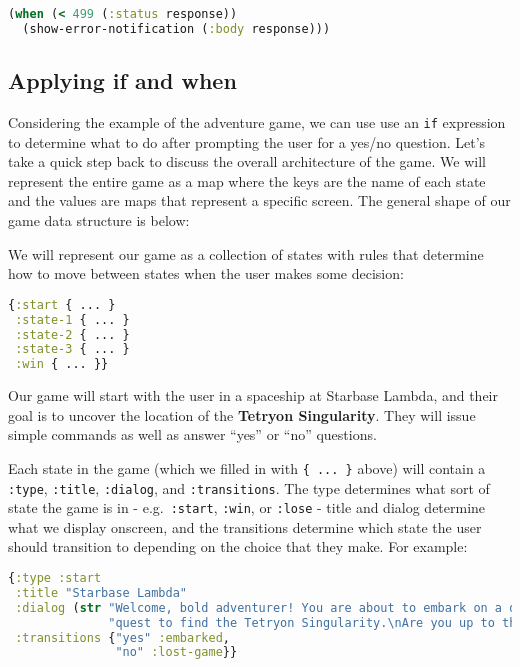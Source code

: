 \documentclass[10pt,twoside,openright]{memoir}
\begin{document}
\begin{lstlisting}[language=Clojure, caption={Conditionally perform side effect}]
(when (< 499 (:status response))
  (show-error-notification (:body response)))
\end{lstlisting}

\subsection{Applying if and when}

Considering the example of the adventure game, we can use use an
\texttt{if} expression to determine what to do after prompting the user
for a yes/no question. Let's take a quick step back to discuss the
overall architecture of the game. We will represent the entire game as a
map where the keys are the name of each state and the values are maps
that represent a specific screen. The general shape of our game data
structure is below:

We will represent our game as a collection of states with rules that
determine how to move between states when the user makes some decision:

\begin{lstlisting}[language=Clojure, caption={Game states}]
{:start { ... }
 :state-1 { ... }
 :state-2 { ... }
 :state-3 { ... }
 :win { ... }}
\end{lstlisting}

Our game will start with the user in a spaceship at Starbase Lambda, and
their goal is to uncover the location of the \textbf{Tetryon
Singularity}. They will issue simple commands as well as answer ``yes''
or ``no'' questions.

Each state in the game (which we filled in with \texttt{\{\ ...\ \}}
above) will contain a \texttt{:type}, \texttt{:title}, \texttt{:dialog},
and \texttt{:transitions}. The type determines what sort of state the
game is in - e.g.~\texttt{:start}, \texttt{:win}, or \texttt{:lose} -
title and dialog determine what we display onscreen, and the transitions
determine which state the user should transition to depending on the
choice that they make. For example:

\begin{lstlisting}[language=Clojure, caption={Example game state}]
{:type :start
 :title "Starbase Lambda"
 :dialog (str "Welcome, bold adventurer! You are about to embark on a dangerous "
              "quest to find the Tetryon Singularity.\nAre you up to the task?")
 :transitions {"yes" :embarked,
               "no" :lost-game}}
\end{lstlisting}
\end{document}
